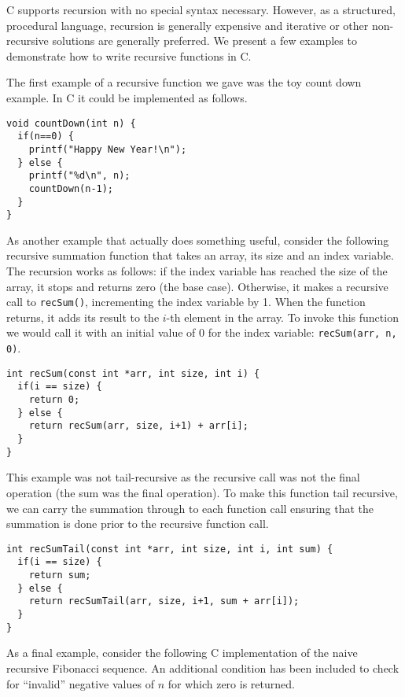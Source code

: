 

C supports recursion with no special syntax necessary.  However, as a structured, 
procedural language, recursion is generally expensive and iterative or
other non-recursive solutions are generally preferred.  We present
a few examples to demonstrate how to write recursive functions in C.

The first example of a recursive function we gave was the toy count down
example.  In C it could be implemented as follows.

\begin{verbatim}
void countDown(int n) {
  if(n==0) {
    printf("Happy New Year!\n");
  } else {
    printf("%d\n", n);
    countDown(n-1);
  }
}
\end{verbatim}

As another example that actually does something useful, consider the
following recursive summation function that takes an array, its size
and an index variable.  The recursion works as follows: if the index
variable has reached the size of the array, it stops and returns zero
(the base case).  Otherwise, it makes a recursive call to 
\texttt{recSum()}, incrementing the index variable by 1.  When
the function returns, it adds its result to the $i$-th element
in the array.  To invoke this function we would call it with an initial
value of 0 for the index variable: \texttt{recSum(arr, n, 0)}.

\begin{verbatim}
int recSum(const int *arr, int size, int i) {
  if(i == size) {
    return 0;
  } else {
    return recSum(arr, size, i+1) + arr[i];
  }
}
\end{verbatim}

This example was not tail-recursive as the recursive call was not the
final operation (the sum was the final operation).  To make this function
tail recursive, we can carry the summation through to each function call
ensuring that the summation is done prior to the recursive function call.

\begin{verbatim}
int recSumTail(const int *arr, int size, int i, int sum) {
  if(i == size) {
    return sum;
  } else {
    return recSumTail(arr, size, i+1, sum + arr[i]);
  }
}
\end{verbatim}

As a final example, consider the following C implementation of the 
naive recursive Fibonacci sequence.  An additional condition has been
included to check for ``invalid'' negative values of $n$ for which
zero is returned.

